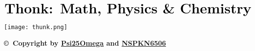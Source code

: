 \documentclass{article}
\begin{document}
\begin{align*}
    \textbf{\huge{Thonk: Math, Physics \& Chemistry}}\\
\end{align*}
\thispagestyle{empty}
\begin{center}
    \texttt{[image: thunk.png]}
\end{center}
\vspace*{\fill}
\begin{center}
    \textbf{\copyright~Copyright by \href{https://github.com/Psi25Omega}{Psi25Omega} and \href{https://github.com/NSPKN6506}{NSPKN6506}}\\
\end{center}
\newpage
\tableofcontents
\newpage


\end{document}
